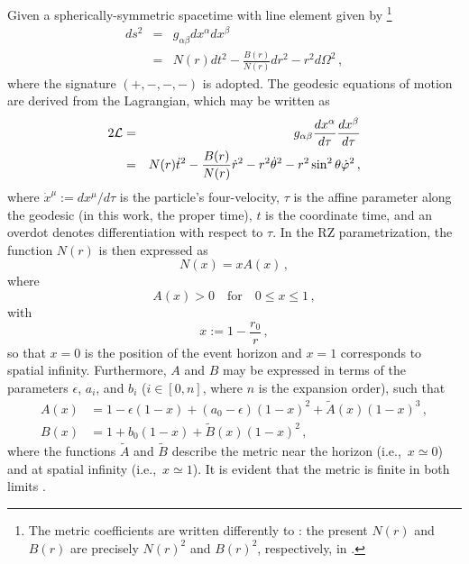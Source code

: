 \documentclass[a4paper,aps,twocolumn,showpacs,showkeys,nofootinbib,preprintnumbers,superscriptaddress,amsmath,amssymb,amsfonts]{revtex4-1}
\newcommand{\ie}{{i.e.,}~}
\begin{document}
Given a spherically-symmetric spacetime with line element given by
\footnote{The metric coefficients are written differently to
\cite{Rezzolla2014}: the present $ N(r)$ and $B(r)$ are 
precisely $N(r)^{2}$ and $B(r)^{2}$, respectively,
in \cite{Rezzolla2014}.}\cite{Rezzolla2014}
%
\begin{eqnarray}
\label{eq:RZ_metric}
ds^2 &=& g_{\alpha\beta} dx^{\alpha}dx^{\beta} \nonumber \\
        &=& N(r)dt^2-\frac{B(r)}{N(r)}dr^2-r^2 d\Omega^2 \,,
\end{eqnarray}
where the signature $(+,-,-,-)$ is adopted.
The geodesic equations of motion are derived from the Lagrangian, which
may be written as
%
\begin{eqnarray}
2{\cal L} &=& g_{\alpha\beta}\frac{dx^\alpha}{d\tau}\frac{dx^\beta}{d\tau} \nonumber \\
              &=& N(r){\dot t}^2-\frac{B(r)}{N(r)}{\dot r}^2-r^2 {\dot \theta}^2-r^2\sin ^2\theta 
                      {\dot \varphi}^2 \,,
\label{lagrangian}
\end{eqnarray}
%
where $\dot{x}^\mu := dx^\mu/d\tau$ is the particle's four-velocity, $\tau$ is
the affine parameter along the geodesic (in this work, the proper time), 
$t$ is the coordinate time, and an overdot denotes
differentiation with respect to $\tau$. In the RZ parametrization, the
function $N(r)$ is then expressed as
%
\begin{equation}
\label{N2}
N(x) = x A(x) \,,
\end{equation}
%
where
%
\begin{equation}
A(x) > 0 \quad\mbox{for}\quad 0\leq x\leq1 \,,
\end{equation}
with
\begin{equation}
x := 1-\frac{r_0}{r}\,,
\label{x}
\end{equation}
so that $x=0$ is the position of the event horizon and $x=1$ corresponds
to spatial infinity. Furthermore, $A$ and $B$ may be expressed in terms
of the parameters $\epsilon$, $a_i$, and $b_i$ ($i\in [0,n]$, where $n$ 
is the expansion order), such that
%
\begin{subequations}
\begin{align}
A(x) &= 1-\epsilon (1-x)+(a_0-\epsilon)(1-x)^2+{\widetilde A}(x)(1-x)^3 \,, \label{asympfix_1}  \\
B(x) &= 1+b_0(1-x)+{\widetilde B}(x)(1-x)^2 \,, \label{asympfix_2}
\end{align}
\end{subequations}
where the functions ${\widetilde A}$ and ${\widetilde B}$ describe the
metric near the horizon (\ie $x \simeq 0$) and at spatial infinity
(\ie $x \simeq 1$). 
It is evident that the metric is finite in
both limits \cite{Rezzolla2014}. 
\end{document}
